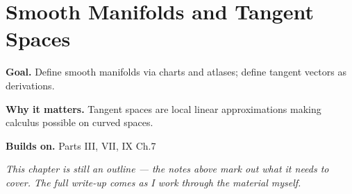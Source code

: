\chapter{Smooth Manifolds and Tangent Spaces}
\label{ch:10-differential-geometry-01}

\begin{chapterintro}
\textbf{Goal.} Define smooth manifolds via charts and atlases; define tangent vectors as derivations.

\textbf{Why it matters.} Tangent spaces are local linear approximations making calculus possible on curved spaces.

\textbf{Builds on.} Parts III, VII, IX Ch.7
\end{chapterintro}

\textit{This chapter is still an outline --- the notes above mark out what it needs to cover. The full write-up comes as I work through the material myself.}
